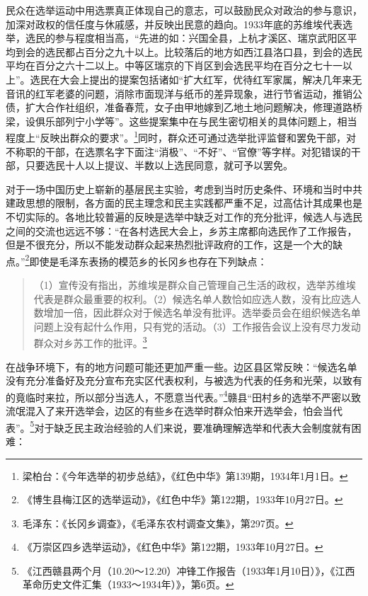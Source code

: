 民众在选举运动中用选票真正体现自己的意志，可以鼓励民众对政治的参与意识，加深对政权的信任度与休戚感，并反映出民意的趋向。1933年底的苏维埃代表选举，选民的参与程度相当高，“先进的如：兴国全县，上杭才溪区、瑞京武阳区平均到会的选民都占百分之九十以上。比较落后的地方如西江县洛口县，到会的选民平均在百分之六十二以上。中等区瑞京的下肖区到会选民平均在百分之七十一以上”。选民在大会上提出的提案包括诸如“扩大红军，优待红军家属，解决几年来无音讯的红军老婆的问题，消除市面现洋与纸币的差异现象，进行节省运动，推销公债，扩大合作社组织，准备春荒，女子由甲地嫁到乙地土地问题解决，修理道路桥梁，设俱乐部列宁小学等”。这些提案集中在与民生密切相关的具体问题上，相当程度上“反映出群众的要求”。\footnote{梁柏台：《今年选举的初步总结》，《红色中华》第139期，1934年1月1日。}同时，群众还可通过选举批评监督和罢免干部，对不称职的干部，在选票名字下面注“消极”、“不好”、“官僚”等字样。对犯错误的干部，只要选民十人以上提议、半数以上选民同意，就可予以罢免。


对于一场中国历史上崭新的基层民主实验，考虑到当时历史条件、环境和当时中共建政思想的限制，各方面的民主理念和民主实践都严重不足，过高估计其成果也是不切实际的。各地比较普遍的反映是选举中缺乏对工作的充分批评，候选人与选民之间的交流也远远不够：“在各村选民大会上，乡苏主席都向选民作了工作报告，但是不很充分，所以不能发动群众起来热烈批评政府的工作，这是一个大的缺点。”\footnote{《博生县梅江区的选举运动》，《红色中华》第122期，1933年10月27日。}即使是毛泽东表扬的模范乡的长冈乡也存在下列缺点：

\begin{quote}

（1）宣传没有指出，苏维埃是群众自己管理自己生活的政权，选举苏维埃代表是群众最重要的权利。（2）候选名单人数恰如应选人数，没有比应选人数增加一倍，因此群众对于候选名单没有批评。选举委员会在组织候选名单问题上没有起什么作用，只有党的活动。（3）工作报告会议上没有尽力发动群众对乡苏工作的批评。\footnote{毛泽东：《长冈乡调查》，《毛泽东农村调查文集》，第297页。}
\end{quote}


在战争环境下，有的地方问题可能还更加严重一些。边区县区常反映：“候选名单没有充分准备好及充分宣布充实区代表权利，与被选为代表的任务和光荣，以致有的竟临时来拉，所以部分当选人，不愿意当代表。”\footnote{《万崇区四乡选举运动》，《红色中华》第122期，1933年10月27日。}赣县“田村乡的选举不严密以致流氓混入了来开选举会，边区的有些乡在选举时群众怕来开选举会，怕会当代表”。\footnote{《江西赣县两个月（10.20～12.20）冲锋工作报告（1933年1月10日）》，《江西革命历史文件汇集（1933～1934年）》，第6页。}对于缺乏民主政治经验的人们来说，要准确理解选举和代表大会制度就有困难：

